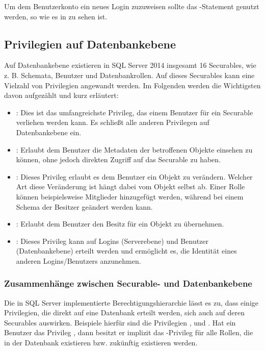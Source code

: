           Um dem Benutzerkonto  ein neues Login
          zuzuweisen sollte das -Statement genutzt
          werden, so wie es in  zu sehen ist.
          \begin{literaturinternet}
            \item \cite{ms175475}
            \item \cite{ms174378}
          \end{literaturinternet}            
      \subsection{Privilegien auf Datenbankebene}
        Auf Datenbankebene existieren in SQL Server 2014 insgesamt 16
        Securables, wie z. B. Schemata, Benutzer und Datenbankrollen. Auf dieses
        Securables kann eine Vielzahl von Privilegien angewandt werden. Im
        Folgenden werden die Wichtigsten davon aufgezählt und kurz erläutert:
        \begin{itemize}
          \item {}: Dies ist das umfangreichste Privileg,
          das einem Benutzer für ein Securable verliehen werden kann. Es
          schließt alle anderen Privilegen auf Datenbankebene ein.
          \item {}: Erlaubt dem Benutzer die Metadaten
          der betroffenen Objekte einsehen zu können, ohne jedoch direkten
          Zugriff auf das Securable zu haben.
          \item {}: Dieses Privileg erlaubt es dem Benutzer ein
          Objekt zu verändern. Welcher Art diese Veränderung ist hängt dabei
          vom Objekt selbst ab. Einer Rolle können beispielsweise Mitglieder
          hinzugefügt werden, während bei einem Schema der Besitzer geändert
          werden kann.
          \item {}: Erlaubt dem Benutzer den Besitz für
          ein Objekt zu übernehmen.
          \item {}: Dieses Privileg kann auf Logins
          (Serverebene) und Benutzer (Datenbankebene) erteilt werden und
          ermöglicht es, die Identität eines anderen Logins/Benutzers
          anzunehmen.
        \end{itemize}
        \subsubsection{Zusammenhänge zwischen Securable- und Datenbankebene}
          Die in SQL Server implementierte Berechtigungshierarchie lässt es zu,
          dass einige Privilegien, die direkt auf eine Datenbank erteilt werden,
          sich auch auf deren Securables auswirken. Beispiele hierfür sind die
          Privilegien ,  und
          . Hat ein Benutzer das Privileg
          , dann besitzt er implizit das
          -Privileg für alle Rollen, die in der Datenbank
          existieren bzw. zukünftig existieren werden.
          
